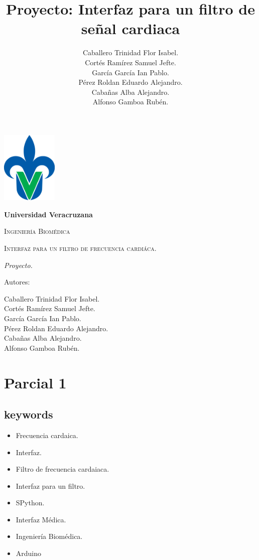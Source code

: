 \documentclass[14pt]{report}
\title{Proyecto: Interfaz para un filtro de señal cardiaca}
\author{Caballero Trinidad Flor Isabel. \\ Cortés Ramírez Samuel Jefte. \\ García García Ian Pablo. \\ Pérez Roldan Eduardo Alejandro. \\ Cabañas Alba Alejandro. \\ Alfonso Gamboa Rubén.}
\begin{document}
\begin{titlepage}
	\centering
	{\includegraphics[width=0.2\textwidth]{recursos/Universidad_Veracruzana}\par}
	\vspace{1cm}
	{\bfseries\LARGE Universidad Veracruzana \par}
	\vspace{1cm}
	{\scshape\Large Ingeniería Biomédica \par}
	\vspace{3cm}
	{\scshape\Huge Interfaz para un filtro de frecuencia cardiáca. \par}
	\vspace{2cm}
	{\itshape\Large Proyecto. \par}
	\vfill
	{\Large Autores: \par}
	{\Large Caballero Trinidad Flor Isabel. \\ Cortés Ramírez Samuel Jefte. \\ García García Ian Pablo. \\ Pérez Roldan Eduardo Alejandro. \\ Cabañas Alba Alejandro. \\ Alfonso Gamboa Rubén. \par}
	\vfill
	
\end{titlepage}

\chapter{Parcial 1}
	\section{keywords}
		\begin{itemize}
			\item Frecuencia cardaica.
			\item Interfaz.
			\item Filtro de frecuencia cardaiaca.
			\item Interfaz para un filtro.
			\item SPython.
			\item Interfaz Médica.
			\item Ingeniería Biomédica.
			\item Arduino
		\end{itemize}
	
\end{document}
